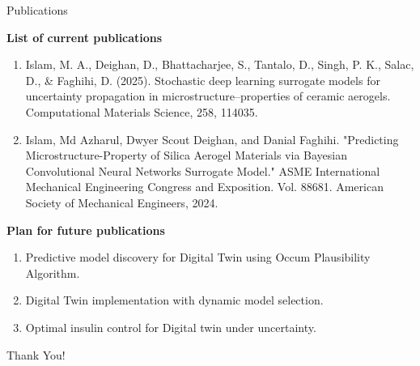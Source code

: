 \documentclass[8pt,xcolor=dvipsnames,compress]{beamer}
\begin{document}
\begin{frame}{Publications}
    
   {\textbf{List of current publications}}\\
    \begin{enumerate}
     \item Islam, M. A., Deighan, D., Bhattacharjee, S., Tantalo, D., Singh, P. K., Salac, D., & Faghihi, D. (2025). Stochastic deep learning surrogate models for uncertainty propagation in microstructure–properties of ceramic aerogels. Computational Materials Science, 258, 114035.
    \item Islam, Md Azharul, Dwyer Scout Deighan, and Danial Faghihi. "Predicting Microstructure-Property of Silica Aerogel Materials via Bayesian Convolutional Neural Networks Surrogate Model." ASME International Mechanical Engineering Congress and Exposition. Vol. 88681. American Society of Mechanical Engineers, 2024.
    \end{enumerate}


   {\textbf{Plan for future publications}}\\
    \begin{enumerate}
     \item Predictive model discovery for Digital Twin using Occum Plausibility Algorithm.
    \item Digital Twin implementation with dynamic model selection.
    \item Optimal insulin control for Digital twin under uncertainty.
    \end{enumerate}
\end{frame}
    
\begin{frame}
    \begin{center}
        \Huge{Thank You!}
    \end{center} \\
\end{frame}
\end{document}
